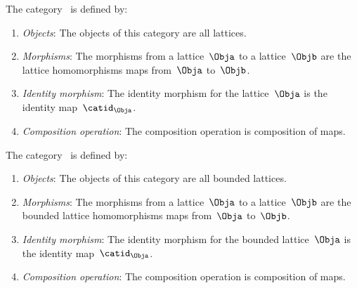 \begin{ctdefinition}
    \label{def:Lat}
    The category~\iindex{\Lat} is defined by:
    \begin{enumerate}
        \item \emph{Objects}: The objects of this category are all lattices.
        \item \emph{Morphisms}: The morphisms from a lattice~$\Obja$ to a lattice~$\Objb$ are the lattice homomorphisms maps from~$\Obja$ to~$\Objb$.
        \item \emph{Identity morphism}: The identity morphism for the lattice~$\Obja$
              is the identity map~$\catid_\Obja$.
        \item \emph{Composition operation}: The composition operation is composition of maps.
    \end{enumerate}
\end{ctdefinition}

\begin{ctdefinition}
    \label{def:BoundedLat}
    The category~\iindex{\BoundedLat} is defined by:
    \begin{enumerate}
        \item \emph{Objects}: The objects of this category are all bounded lattices.
        \item \emph{Morphisms}: The morphisms from a lattice~$\Obja$ to a lattice~$\Objb$ are the bounded lattice homomorphisms maps from~$\Obja$ to~$\Objb$.
        \item \emph{Identity morphism}: The identity morphism for the bounded lattice~$\Obja$
              is the identity map~$\catid_\Obja$.
        \item \emph{Composition operation}: The composition operation is composition of maps.
    \end{enumerate}
\end{ctdefinition}

